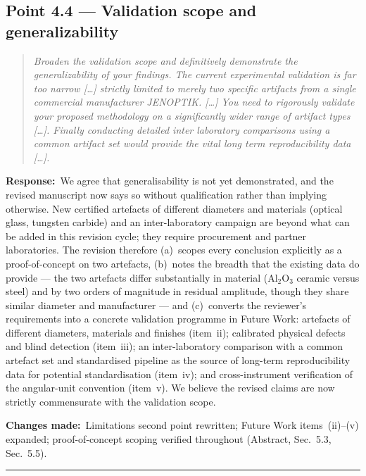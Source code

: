 \documentclass[11pt,a4paper]{article}
\newenvironment{reviewercomment}%
{\par\medskip\noindent\begin{quotation}\itshape\color{black!70}}%
{\end{quotation}\medskip}
\newcommand{\response}{\par\noindent\textbf{Response:}\ }
\newcommand{\changes}{\par\noindent\textbf{Changes made:}\ }
\begin{document}
\subsection*{Point 4.4 --- Validation scope and generalizability}
\begin{reviewercomment}
Broaden the validation scope and definitively demonstrate the generalizability of your findings. The current experimental validation is far too narrow [\ldots] strictly limited to merely two specific artifacts from a single commercial manufacturer JENOPTIK. [\ldots] You need to rigorously validate your proposed methodology on a significantly wider range of artifact types [\ldots]. Finally conducting detailed inter laboratory comparisons using a common artifact set would provide the vital long term reproducibility data [\ldots].
\end{reviewercomment}
\response We agree that generalisability is not yet demonstrated, and the revised manuscript now says so without qualification rather than implying otherwise. New certified artefacts of different diameters and materials (optical glass, tungsten carbide) and an inter-laboratory campaign are beyond what can be added in this revision cycle; they require procurement and partner laboratories. The revision therefore (a)~scopes every conclusion explicitly as a proof-of-concept on two artefacts, (b)~notes the breadth that the existing data do provide --- the two artefacts differ substantially in material (Al$_2$O$_3$ ceramic versus steel) and by two orders of magnitude in residual amplitude, though they share similar diameter and manufacturer --- and (c)~converts the reviewer's requirements into a concrete validation programme in Future Work: artefacts of different diameters, materials and finishes (item~ii); calibrated physical defects and blind detection (item~iii); an inter-laboratory comparison with a common artefact set and standardised pipeline as the source of long-term reproducibility data for potential standardisation (item~iv); and cross-instrument verification of the angular-unit convention (item~v). We believe the revised claims are now strictly commensurate with the validation scope.
\changes Limitations second point rewritten; Future Work items~(ii)--(v) expanded; proof-of-concept scoping verified throughout (Abstract, Sec.~5.3, Sec.~5.5).

\bigskip
\hrule
\end{document}
